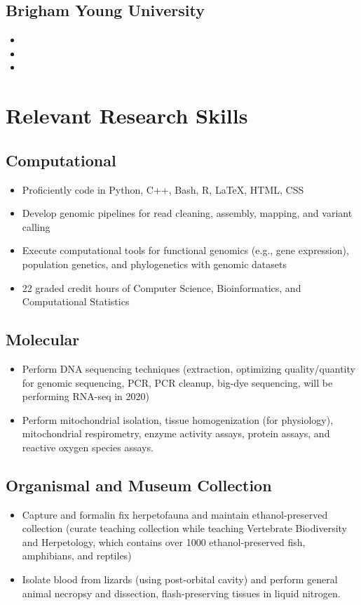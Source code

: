 \documentclass[11pt,a4paper,sans]{moderncv}        %
\begin{document}
\subsection{Brigham Young University}
\begin{itemize}
	\item{}
	\item{}
	\item{}
\end{itemize}

\section{Relevant Research Skills}
\subsection{Computational}
\begin{itemize}
	\item{Proficiently code in Python, C++, Bash, R, LaTeX, HTML, CSS}
	\item{Develop genomic pipelines for read cleaning, assembly, mapping, and variant calling}
	\item{Execute computational tools for functional genomics (e.g., gene expression), population genetics, and phylogenetics with genomic datasets}
	\item{22 graded credit hours of Computer Science, Bioinformatics, and Computational Statistics}
\end{itemize}
\subsection{Molecular}
\begin{itemize}
	\item{Perform DNA sequencing techniques (extraction, optimizing quality/quantity for genomic sequencing, PCR, PCR cleanup, big-dye sequencing, will be performing RNA-seq in 2020)}
	\item{Perform mitochondrial isolation, tissue homogenization (for physiology), mitochondrial respirometry, enzyme activity assays, protein assays, and reactive oxygen species assays.}
\end{itemize}
\subsection{Organismal and Museum Collection}
\begin{itemize}
	\item{Capture and formalin fix herpetofauna and maintain ethanol-preserved collection (curate teaching collection while teaching Vertebrate Biodiversity and Herpetology, which contains over 1000 ethanol-preserved fish, amphibians, and reptiles)}
	\item{Isolate blood from lizards (using post-orbital cavity) and perform general animal necropsy and dissection, flash-preserving tissues in liquid nitrogen.}
\end{itemize}
\end{document}
